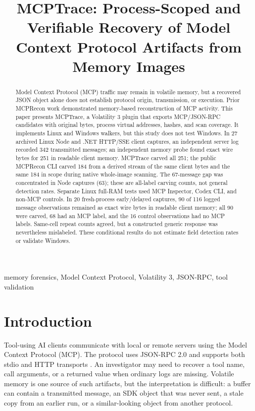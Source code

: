 \documentclass[conference,10pt]{IEEEtran}
\title{MCPTrace: Process-Scoped and Verifiable Recovery of Model Context Protocol Artifacts from Memory Images}
\author{\IEEEauthorblockN{Taewook Kwon}
\IEEEauthorblockA{Gyeongbuk Software Meister High School\\
Uiseong, Republic of Korea}}
\begin{document}
\maketitle

\begin{abstract}
Model Context Protocol (MCP) traffic may remain in volatile memory, but a recovered JSON object alone does not establish protocol origin, transmission, or execution. Prior MCPRecon work demonstrated memory-based reconstruction of MCP activity. This paper presents MCPTrace, a Volatility 3 plugin that exports MCP/JSON-RPC candidates with original bytes, process virtual addresses, hashes, and scan coverage. It implements Linux and Windows walkers, but this study does not test Windows. In 27 archived Linux Node and .NET HTTP/SSE client captures, an independent server log recorded 342 transmitted messages; an independent memory probe found exact wire bytes for 251 in readable client memory. MCPTrace carved all 251; the public MCPRecon CLI carved 184 from a derived stream of the same client bytes and the same 184 in scope during native whole-image scanning. The 67-message gap was concentrated in Node captures (63); these are all-label carving counts, not general detection rates. Separate Linux full-RAM tests used MCP Inspector, Codex CLI, and non-MCP controls. In 20 fresh-process early/delayed captures, 90 of 116 logged message observations remained as exact wire bytes in readable client memory; all 90 were carved, 68 had an MCP label, and the 16 control observations had no MCP labels. Same-cell repeat counts agreed, but a constructed generic response was nevertheless mislabeled. These conditional results do not estimate field detection rates or validate Windows.
\end{abstract}

\begin{IEEEkeywords}
memory forensics, Model Context Protocol, Volatility 3, JSON-RPC, tool validation
\end{IEEEkeywords}

\section{Introduction}
Tool-using AI clients communicate with local or remote servers using the Model Context Protocol (MCP). The protocol uses JSON-RPC 2.0 and supports both stdio and HTTP transports \cite{mcp-spec,jsonrpc}. An investigator may need to recover a tool name, call arguments, or a returned value when ordinary logs are missing. Volatile memory is one source of such artifacts, but the interpretation is difficult: a buffer can contain a transmitted message, an SDK object that was never sent, a stale copy from an earlier run, or a similar-looking object from another protocol.
\end{document}
